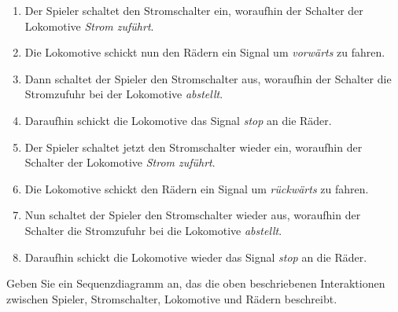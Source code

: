 \documentclass{bschlangaul-aufgabe}
\begin{document}
\begin{enumerate}

\item Der Spieler schaltet den Stromschalter ein, woraufhin der Schalter
der Lokomotive \emph{Strom zuführt}.

\item Die Lokomotive schickt nun den Rädern ein Signal um
\emph{vorwärts} zu fahren.

\item Dann schaltet der Spieler den Stromschalter aus, woraufhin der
Schalter die Stromzufuhr bei der Lokomotive \emph{abstellt}.

\item Daraufhin schickt die Lokomotive das Signal \emph{stop} an die
Räder.

\item Der Spieler schaltet jetzt den Stromschalter wieder ein, woraufhin
der Schalter der Lokomotive \emph{Strom zuführt}.

\item Die Lokomotive schickt den Rädern ein Signal um \emph{rückwärts}
zu fahren.

\item Nun schaltet der Spieler den Stromschalter wieder aus, woraufhin
der Schalter die Stromzufuhr bei die Lokomotive \emph{abstellt}.

\item Daraufhin schickt die Lokomotive wieder das Signal \emph{stop} an
die Räder.
\end{enumerate}

\noindent
Geben Sie ein Sequenzdiagramm an, das die oben beschriebenen
Interaktionen zwischen Spieler, Stromschalter, Lokomotive und Rädern
beschreibt.
\end{document}
